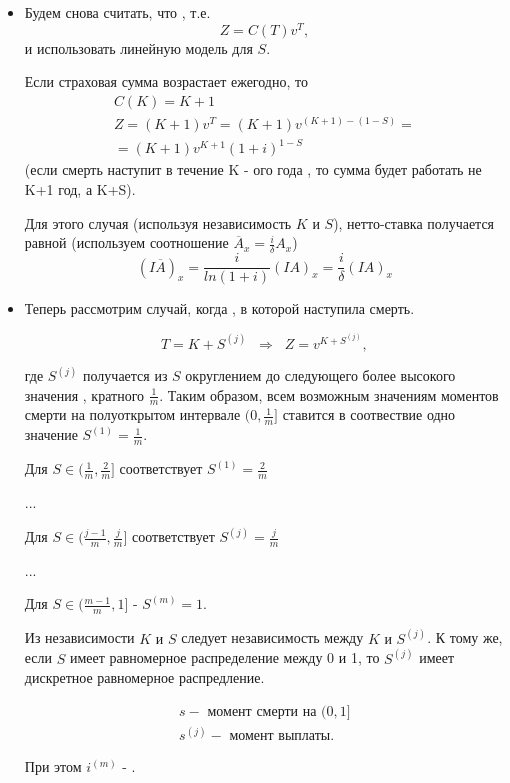 \begin{itemize}
	\item Будем снова считать, что , т.е. 
	\[ Z = C(T)v^T, \]
	и использовать линейную модель для $ S.$

	Если страховая сумма возрастает ежегодно, то 
	\begin{gather*}
		C(K) = K+1\\
		Z = (K+1)v^{T} = (K+1)v^{(K+1) - (1-S)}=\\
		=(K+1)v^{K+1}(1+i)^{1-S} 
	\end{gather*}
	(если смерть наступит в течение K - ого года , то сумма будет работать не K+1 год, а K+S).

	Для этого случая (используя независимость $ K \text{ и } S$), нетто-ставка получается равной (используем соотношение $ \overline{A}_x = \frac{i}{\delta}A_x $) 
	\[(I\overline{A})_x  = \frac{i}{ln(1+i)}(IA)_x = \frac{i}{\delta}(IA)_x\]

	\item  Теперь рассмотрим случай, когда , в которой наступила смерть.

	\[ T= K + S^{(j)} \;\; \Rightarrow \;\; Z = v^{K+S^{(j)}},\]

	где $ S^{(j)}$ получается из $ S$ округлением до следующего более высокого значения , кратного $ \frac{1}{m}$. Таким образом, всем возможным значениям моментов смерти на полуоткрытом интервале $(0,\frac{1}{m}]$ ставится в соотвествие одно значение $S^{(1)} = \frac{1}{m}$.

	Для $S \in (\frac{1}{m},\frac{2}{m}]$ соответствует $S^{(1)} = \frac{2}{m}$

	...

	Для $S \in (\frac{j-1}{m},\frac{j}{m}]$ соответствует $S^{(j)} = \frac{j}{m}$

	...

	Для $S \in (\frac{m-1}{m},1]$ - $S^{(m)} = 1.$

	Из независимости $K \text{ и } S$ следует независимость между $K \text{ и } S^{(j)}$. К тому же, если $S$ имеет равномерное распределение между 0 и 1, то $S^{(j)}$ имеет дискретное равномерное распредление.

	\begin{gather*}
		s - \text{ момент смерти на } (0,1]\\
		s^{(j)} - \text{ момент выплаты}.
	\end{gather*}

	При этом $i^{(m)}$ - .


\end{itemize}
